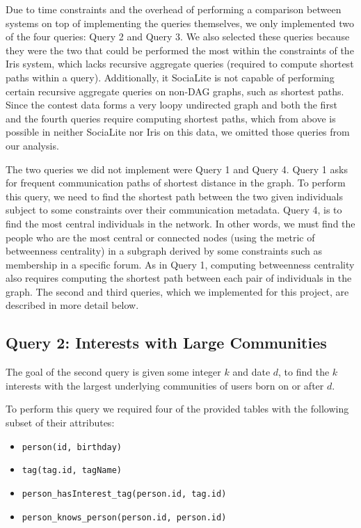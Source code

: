 \documentclass{article}
\begin{document}
\begin{multicols}{2}
Due to time constraints and the overhead of performing a comparison between systems on top of implementing the queries themselves, we only implemented two of the four queries: Query 2 and Query 3. We also selected these queries because they were the two that could be performed the most within the constraints of the Iris system, which lacks recursive aggregate queries (required to compute shortest paths within a query). Additionally, it SociaLite is not capable of performing certain recursive aggregate queries on non-DAG graphs, such as shortest paths. Since the contest data forms a very loopy undirected graph and both the first and the fourth queries require computing shortest paths, which from above is possible in neither SociaLite nor Iris on this data, we omitted those queries from our analysis.

The two queries we did not implement were Query 1 and Query 4. Query 1 asks for frequent communication paths of shortest distance in the graph. To perform this query, we need to find the shortest path between the two given individuals subject to some constraints over their communication metadata. Query 4, is to find the most central individuals in the network. In other words, we must find the people who are the most central or connected nodes (using the metric of betweenness centrality) in a subgraph derived by some constraints such as membership in a specific forum. As in Query 1, computing betweenness centrality also requires computing the shortest path between each pair of individuals in the graph. The second and third queries, which we implemented for this project, are described in more detail below.

\subsection{Query 2: Interests with Large Communities}
The goal of the second query is given some integer $k$ and date $d$, to find the $k$ interests with the largest underlying communities of users born on or after $d$.

To perform this query we required four of the provided tables with the following subset of their attributes: 
\begin{itemize}
\item \texttt{person(id, birthday)}
\item \texttt{tag(tag.id, tagName)}
\item \texttt{person\_hasInterest\_tag(person.id, tag.id)}
\item \texttt{person\_knows\_person(person.id, person.id)}
\end{itemize}


\end{multicols}
\end{document}
